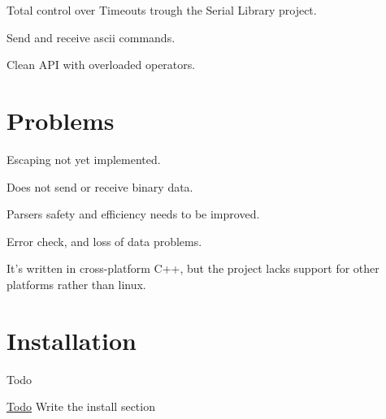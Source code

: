 \begin{DoxyItemize}
\item Total control over Timeouts trough the Serial Library project.
\item Send and receive ascii commands.
\item Clean A\+P\+I with overloaded operators.
\end{DoxyItemize}\hypertarget{index_problems}{}\section{Problems}\label{index_problems}

\begin{DoxyItemize}
\item Escaping not yet implemented.
\item Does not send or receive binary data.
\item Parsers safety and efficiency needs to be improved.
\item Error check, and loss of data problems.
\item It's written in cross-\/platform C++, but the project lacks support for other platforms rather than linux.
\end{DoxyItemize}\hypertarget{index_install}{}\section{Installation}\label{index_install}
\begin{DoxyRefDesc}{Todo}
\item[\hyperlink{todo__todo000002}{Todo}]Write the install section \end{DoxyRefDesc}
